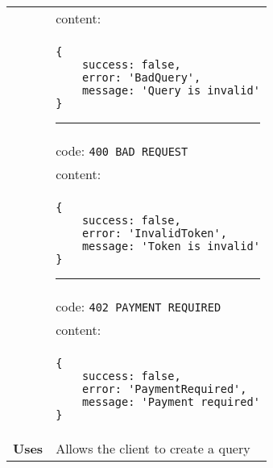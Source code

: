 \begin{adjustwidth}{1cm}{}
\begin{tabular}{|c|l|}
              &                     content: \\
              & \begin{minipage}[t]{0.7\textwidth}
                \begin{adjustwidth}{1.5cm}{}
                \begin{verbatim}
{
    success: false, 
    error: 'BadQuery',
    message: 'Query is invalid'
}
                \end{verbatim}
                \end{adjustwidth}
                 \par\noindent\rule{\textwidth}{1pt}
                 \vspace{4pt}
              \end{minipage} \\
              &                     code: \texttt{400 BAD REQUEST} \\
              &                     content: \\
              & \begin{minipage}[t]{0.7\textwidth}
                \begin{adjustwidth}{1.5cm}{}
                \begin{verbatim}
{
    success: false, 
    error: 'InvalidToken',
    message: 'Token is invalid'
}
                \end{verbatim}
                \end{adjustwidth}
                \par\noindent\rule{\textwidth}{1pt}
                 \vspace{4pt}
              \end{minipage} \\
              &                     code: \texttt{402 PAYMENT REQUIRED} \\
              &                     content: \\
              & \begin{minipage}[t]{0.7\textwidth}
                \begin{adjustwidth}{1.5cm}{}
                \begin{verbatim}
{
    success: false, 
    error: 'PaymentRequired',
    message: 'Payment required'
}
                \end{verbatim}
                \end{adjustwidth}
              \end{minipage} \\
              \hline
            \textbf{Uses} & Allows the client to create a query \\
            \hline
        \end{tabular}
    \end{adjustwidth} 
    
